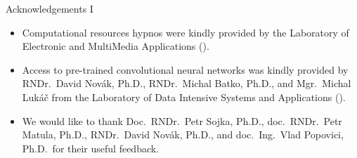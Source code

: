 \begin{frame}{Acknowledgements I}
\begin{itemize}
\item<1-3> Computational resources \alert{hypnos} were kindly provided by
  \alert{the Laboratory of Electronic and MultiMedia Applications}
  (\alert{}).
\item<2-3> Access to pre-trained  convolutional neural networks was
  kindly provided by
  \alert{RNDr.\ David Novák},
  \alert{Ph.D., RNDr.\ Michal Batko, Ph.D.}, and
  \alert{Mgr.\ Michal Lukáč}
  from \alert{the Laboratory of Data Intensive Systems and Applications}
  (\alert{}).
\item<3-3> We would like to thank
  \alert{Doc.\ RNDr.\ Petr Sojka, Ph.D.}, 
  \alert{doc.\ RNDr.\ Petr Matula, Ph.D.},
  \alert{RNDr.\ David Novák, Ph.D.}, and
  \alert{doc.\ Ing.\ Vlad Popovici}, Ph.D.\ for their useful feedback.
\end{itemize}

\begin{center}%
%
%
%
\end{center}%
\end{frame}

